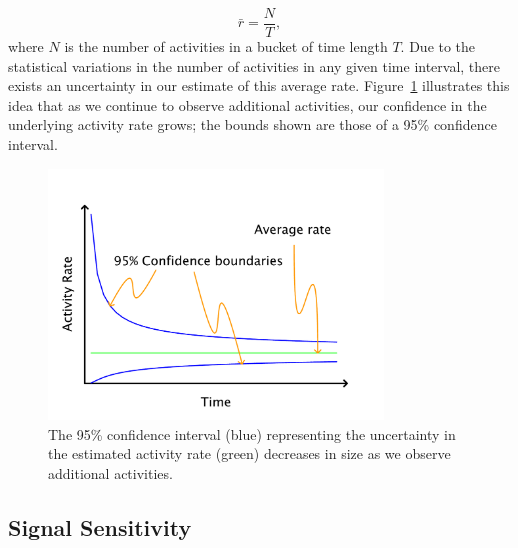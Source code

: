 \documentclass{article}
\begin{document}
\begin{equation}
    \label{eq:rateEst}
    \bar{r} = \frac{N}{T},
\end{equation}
where $N$ is the number of activities in a bucket of time length $T$. Due to the statistical
variations in the number of activities in any given time interval, there exists an uncertainty in our 
estimate of this average rate. Figure~\ref{fig:confidence} illustrates this idea that as we continue to 
observe additional activities, our confidence in the underlying activity rate grows; the bounds shown 
are those of a 95\% confidence interval.



%
\begin{figure}[h]
	\begin{center}
		\includegraphics[width=3.5in]{./imgs/fig2.pdf}
	\end{center}
	\caption{The 95\% confidence interval (blue) representing the uncertainty in the estimated activity 
		rate (green) decreases in size as we observe additional activities. }
    	\label{fig:confidence}
\end{figure}
%
%

%


\subsection{Signal Sensitivity}
\label{sens}
\end{document}
